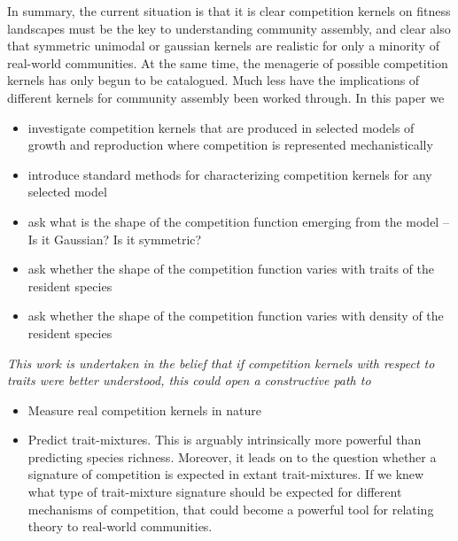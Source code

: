 \documentclass[a4paper,11pt]{article}
\begin{document}
In summary, the current situation is that it is clear competition kernels on fitness landscapes must be the key to understanding community assembly, and clear also that symmetric unimodal or gaussian kernels are realistic for only a minority of real-world communities. At the same time, the menagerie of possible competition kernels has only begun to be catalogued. Much less have the implications of different kernels for community assembly been worked through. In this paper we 
\begin{itemize} 
\item investigate competition kernels that are produced in selected models of growth and reproduction where competition is represented mechanistically
\item introduce standard methods for characterizing competition kernels for any selected model
\item ask what is the shape of the competition function emerging from the model -- Is it Gaussian? Is it symmetric?
\item ask whether the shape of the competition function varies with traits of the resident species
\item ask whether the shape of the competition function varies with density of the resident species
\end{itemize}

\textit{This work is undertaken in the belief that if competition kernels with respect to traits were better understood, this could open a constructive path to}
\begin{itemize}
\item Measure real competition kernels in nature
\item Predict trait-mixtures. This is arguably intrinsically more powerful than predicting species richness. Moreover, it leads on to the question whether a signature of competition is expected in extant trait-mixtures. If we knew what type of trait-mixture signature should be expected for different mechanisms of competition, that could become a powerful tool for relating theory to real-world communities. 
\end{itemize}  

\end{document}
